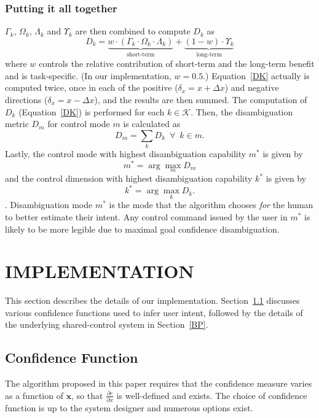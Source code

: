 \documentclass[conference]{IEEEtran}
\newcommand{\argmax}{\arg\!\max}
\begin{document}
\subsubsection*{Putting it all together}
$\Gamma_k$, $\Omega_k$, $\Lambda_k$ and $\Upsilon_k$ are then combined to compute $D_{k}$ as 
\begin{equation}\label{DK}
D_{k} = \underbrace{w\cdot(\Gamma_k\cdot \Omega_k\cdot\Lambda_k)}_{\text{short-term}} + \underbrace{(1 - w)\cdot \Upsilon_k}_{\text{long-term}}
\end{equation}
where $w$ controls the relative contribution of short-term and the long-term benefit and is task-specific. (In our implementation, $w=0.5$.) Equation~\ref{DK} actually is computed twice, once in each of the positive ($\delta_x = x + \Delta x$) and negative directions ($\delta_x = x - \Delta x$), and the results are then summed. The computation of $D_k$ (Equation~\ref{DK}) is performed for each $k \in \mathcal{K}$. Then, the disambiguation metric $D_m$ for control mode $m$ is calculated as 
\begin{equation}\label{EQ2}
D_m = \sum_{k} D_{k} \;~ \forall \;~ k \in m.
\end{equation}
Lastly, the control mode with highest disambiguation capability $m^*$ is given by
\begin{equation*}
m^* = \argmax_m  D_{m}
\end{equation*}
and the control dimension with highest disambiguation capability $k^{*}$ is given by
\begin{equation*}
k^* = \argmax_k D_k.
\end{equation*}
.
Disambiguation mode $m^{*}$ is the mode that the algorithm chooses \textit{for} the human to better estimate their intent. Any control command issued by the user in $m^*$ is likely to be more legible due to maximal goal confidence disambiguation.

\section{IMPLEMENTATION}\label{IMPL}
This section describes the details of our implementation. Section~\ref{CF} discusses various confidence functions used to infer user intent, followed by the details of the underlying shared-control system in Section~\ref{BP}.
\subsection{Confidence Function}\label{CF}
The algorithm proposed in this paper requires that the confidence measure varies as a function of $\boldsymbol{x}$, so that $\frac{\partial c}{\partial x}$ is well-defined and exists. The choice of confidence function is up to the system designer and numerous options exist.
 
\end{document}
